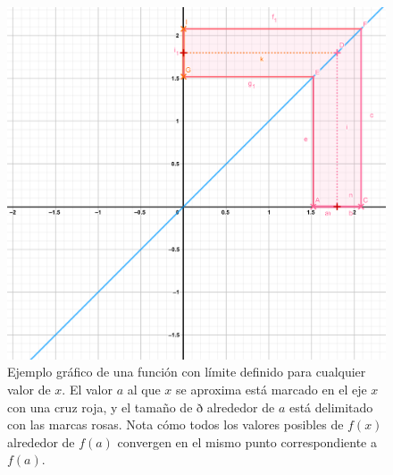 \documentclass[
]{book}
\begin{document}
\begin{figure}

{\centering \includegraphics{Unidad-III/Limite-x} 

}

\caption{Ejemplo gráfico de una función con límite definido para cualquier valor de $x$. El valor $a$ al que $x$ se aproxima está marcado en el eje $x$ con una cruz roja, y el tamaño de ð alrededor de $a$ está delimitado con las marcas rosas. Nota cómo todos los valores posibles de $f(x)$ alrededor de $f(a)$ convergen en el mismo punto correspondiente a $f(a)$.}\label{fig:limite-def}
\end{figure}
\end{document}
